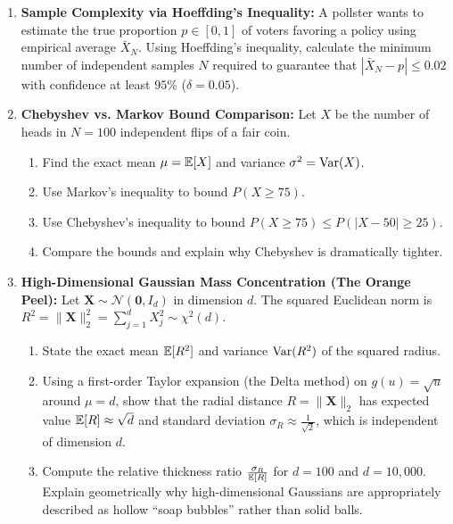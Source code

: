\begin{enumerate}[label=\textbf{P\arabic*.}]
    \item \textbf{Sample Complexity via Hoeffding's Inequality:}
    A pollster wants to estimate the true proportion $p \in [0, 1]$ of voters favoring a policy using empirical average $\bar{X}_N$.
    Using Hoeffding's inequality, calculate the minimum number of independent samples $N$ required to guarantee that $|\bar{X}_N - p| \le 0.02$ with confidence at least $95\%$ ($\delta = 0.05$).

    \item \textbf{Chebyshev vs. Markov Bound Comparison:}
    Let $X$ be the number of heads in $N = 100$ independent flips of a fair coin.
    \begin{enumerate}[label=(\alph*)]
        \item Find the exact mean $\mu = \operatorname{\mathbb{E}}[X]$ and variance $\sigma^2 = \operatorname{Var}(X)$.
        \item Use Markov's inequality to bound $P(X \ge 75)$.
        \item Use Chebyshev's inequality to bound $P(X \ge 75) \le P(|X - 50| \ge 25)$.
        \item Compare the bounds and explain why Chebyshev is dramatically tighter.
    \end{enumerate}

    \item \textbf{High-Dimensional Gaussian Mass Concentration (The Orange Peel):}
    Let $\mathbf{X} \sim \mathcal{N}(\mathbf{0}, I_d)$ in dimension $d$. The squared Euclidean norm is $R^2 = \|\mathbf{X}\|_2^2 = \sum_{j=1}^d X_j^2 \sim \chi^2(d)$.
    \begin{enumerate}[label=(\alph*)]
        \item State the exact mean $\operatorname{\mathbb{E}}[R^2]$ and variance $\operatorname{Var}(R^2)$ of the squared radius.
        \item Using a first-order Taylor expansion (the Delta method) on $g(u) = \sqrt{u}$ around $\mu = d$, show that the radial distance $R = \|\mathbf{X}\|_2$ has expected value $\operatorname{\mathbb{E}}[R] \approx \sqrt{d}$ and standard deviation $\sigma_R \approx \frac{1}{\sqrt{2}}$, which is independent of dimension $d$.
        \item Compute the relative thickness ratio $\frac{\sigma_R}{\operatorname{\mathbb{E}}[R]}$ for $d = 100$ and $d = 10{,}000$. Explain geometrically why high-dimensional Gaussians are appropriately described as hollow ``soap bubbles'' rather than solid balls.
    \end{enumerate}


\end{enumerate}
